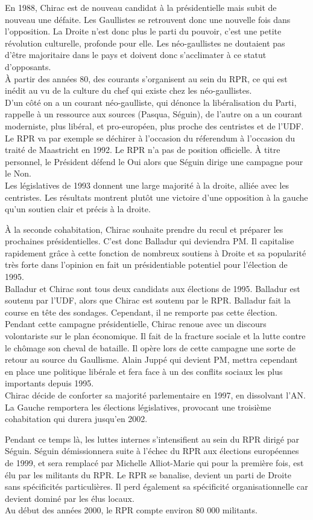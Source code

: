 \documentclass[10pt, a4paper, openany]{book}
\begin{document}
En 1988, Chirac est de nouveau candidat à la présidentielle mais subit de nouveau une défaite. Les Gaullistes se retrouvent donc une nouvelle fois dans l'opposition. La Droite n'est donc plus le parti du pouvoir, c'est une petite révolution culturelle, profonde pour elle. Les néo-gaullistes ne doutaient pas d'être majoritaire dans le pays et doivent donc s'acclimater à ce statut d'opposants. \\
À partir des années 80, des courants s'organisent au sein du RPR, ce qui est inédit au vu de la culture du chef qui existe chez les néo-gaullistes. \\
D'un côté on a un courant néo-gaulliste, qui dénonce la libéralisation du Parti, rappelle à un ressource aux sources (Pasqua, Séguin), de l'autre on a un courant moderniste, plus libéral, et pro-européen, plus proche des centristes et de l'UDF. Le RPR va par exemple se déchirer à l'occasion du réferendum à l'occasion du traité de Maastricht en 1992. Le RPR n'a pas de position officielle. À titre personnel, le Président défend le Oui alors que Séguin dirige une campagne pour le Non. \\
Les législatives de 1993 donnent une large majorité à la droite, alliée avec les centristes. Les résultats montrent plutôt une victoire d'une opposition à la gauche qu'un soutien clair et précis à la droite. 


À la seconde cohabitation, Chirac souhaite prendre du recul et préparer les prochaines présidentielles. C'est donc Balladur qui deviendra PM. Il capitalise rapidement grâce à cette fonction de nombreux soutiens à Droite et sa popularité très forte dans l'opinion en fait un présidentiable potentiel pour l'élection de 1995. \\
Balladur et Chirac sont tous deux candidats aux élections de 1995. Balladur est soutenu par l'UDF, alors que Chirac est soutenu par le RPR. Balladur fait la course en tête des sondages. Cependant, il ne remporte pas cette élection. \\
Pendant cette campagne présidentielle, Chirac renoue avec un discours volontariste sur le plan économique. Il fait de la fracture sociale et la lutte contre le chômage son cheval de bataille. Il opère lors de cette campagne une sorte de retour au source du Gaullisme. Alain Juppé qui devient PM, mettra cependant en place une politique libérale et fera face à un des conflits sociaux les plus importants depuis 1995. \\
Chirac décide de conforter sa majorité parlementaire en 1997, en dissolvant l'AN. La Gauche remportera les élections législatives, provocant une troisième cohabitation qui durera jusqu'en 2002. 


Pendant ce temps là, les luttes internes s'intensifient au sein du RPR dirigé par Séguin. Séguin démissionnera suite à l'échec du RPR aux élections européennes de 1999, et sera remplacé par Michelle Alliot-Marie qui pour la première fois, est élu par les militants du RPR. Le RPR se banalise, devient un parti de Droite sans spécificités particulières. Il perd également sa spécificité organisationnelle car devient dominé par les élus locaux. \\
Au début des années 2000, le RPR compte environ 80 000 militants. 
\end{document}
